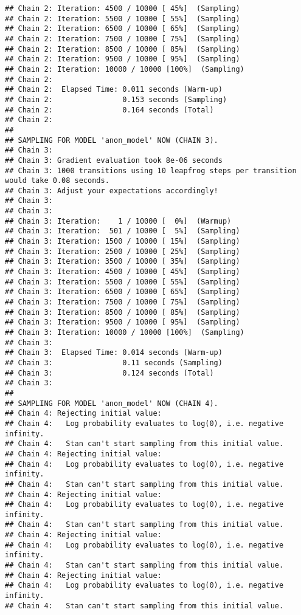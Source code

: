 \documentclass[
]{article}
\begin{document}
\begin{verbatim}
## Chain 2: Iteration: 4500 / 10000 [ 45%]  (Sampling)
## Chain 2: Iteration: 5500 / 10000 [ 55%]  (Sampling)
## Chain 2: Iteration: 6500 / 10000 [ 65%]  (Sampling)
## Chain 2: Iteration: 7500 / 10000 [ 75%]  (Sampling)
## Chain 2: Iteration: 8500 / 10000 [ 85%]  (Sampling)
## Chain 2: Iteration: 9500 / 10000 [ 95%]  (Sampling)
## Chain 2: Iteration: 10000 / 10000 [100%]  (Sampling)
## Chain 2: 
## Chain 2:  Elapsed Time: 0.011 seconds (Warm-up)
## Chain 2:                0.153 seconds (Sampling)
## Chain 2:                0.164 seconds (Total)
## Chain 2: 
## 
## SAMPLING FOR MODEL 'anon_model' NOW (CHAIN 3).
## Chain 3: 
## Chain 3: Gradient evaluation took 8e-06 seconds
## Chain 3: 1000 transitions using 10 leapfrog steps per transition would take 0.08 seconds.
## Chain 3: Adjust your expectations accordingly!
## Chain 3: 
## Chain 3: 
## Chain 3: Iteration:    1 / 10000 [  0%]  (Warmup)
## Chain 3: Iteration:  501 / 10000 [  5%]  (Sampling)
## Chain 3: Iteration: 1500 / 10000 [ 15%]  (Sampling)
## Chain 3: Iteration: 2500 / 10000 [ 25%]  (Sampling)
## Chain 3: Iteration: 3500 / 10000 [ 35%]  (Sampling)
## Chain 3: Iteration: 4500 / 10000 [ 45%]  (Sampling)
## Chain 3: Iteration: 5500 / 10000 [ 55%]  (Sampling)
## Chain 3: Iteration: 6500 / 10000 [ 65%]  (Sampling)
## Chain 3: Iteration: 7500 / 10000 [ 75%]  (Sampling)
## Chain 3: Iteration: 8500 / 10000 [ 85%]  (Sampling)
## Chain 3: Iteration: 9500 / 10000 [ 95%]  (Sampling)
## Chain 3: Iteration: 10000 / 10000 [100%]  (Sampling)
## Chain 3: 
## Chain 3:  Elapsed Time: 0.014 seconds (Warm-up)
## Chain 3:                0.11 seconds (Sampling)
## Chain 3:                0.124 seconds (Total)
## Chain 3: 
## 
## SAMPLING FOR MODEL 'anon_model' NOW (CHAIN 4).
## Chain 4: Rejecting initial value:
## Chain 4:   Log probability evaluates to log(0), i.e. negative infinity.
## Chain 4:   Stan can't start sampling from this initial value.
## Chain 4: Rejecting initial value:
## Chain 4:   Log probability evaluates to log(0), i.e. negative infinity.
## Chain 4:   Stan can't start sampling from this initial value.
## Chain 4: Rejecting initial value:
## Chain 4:   Log probability evaluates to log(0), i.e. negative infinity.
## Chain 4:   Stan can't start sampling from this initial value.
## Chain 4: Rejecting initial value:
## Chain 4:   Log probability evaluates to log(0), i.e. negative infinity.
## Chain 4:   Stan can't start sampling from this initial value.
## Chain 4: Rejecting initial value:
## Chain 4:   Log probability evaluates to log(0), i.e. negative infinity.
## Chain 4:   Stan can't start sampling from this initial value.

\end{verbatim}
\end{document}

